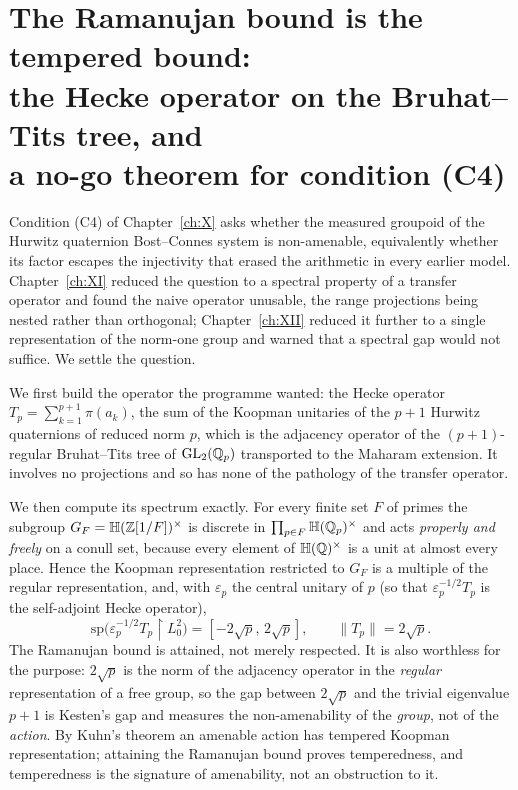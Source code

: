 \chapter[The Ramanujan bound is the tempered bound]{The Ramanujan bound is the tempered bound:\\ the Hecke operator on the Bruhat--Tits tree, and\\ a no-go theorem for condition (C4)}\label{ch:XXVIII}
\renewcommand{\Nrd}{\operatorname{Nrd}}
\begin{summary}
Condition (C4) of Chapter~\ref{ch:X} asks whether the measured groupoid of the Hurwitz
quaternion Bost--Connes system is non-amenable, equivalently whether its factor escapes the
injectivity that erased the arithmetic in every earlier model. Chapter~\ref{ch:XI} reduced the question to a
spectral property of a transfer operator and found the naive operator unusable, the range
projections being nested rather than orthogonal; Chapter~\ref{ch:XII} reduced it further to a single
representation of the norm-one group and warned that a spectral gap would not suffice. We settle
the question.

We first build the operator the programme wanted: the Hecke operator
$T_p=\sum_{k=1}^{p+1}\pi(a_k)$, the sum of the Koopman unitaries of the $p+1$ Hurwitz quaternions
of reduced norm $p$, which is the adjacency operator of the $(p+1)$-regular Bruhat--Tits tree of
$\mathrm{GL}_2(\mathbb{Q}_p)$ transported to the Maharam extension. It involves no projections and so has
none of the pathology of the transfer operator.

We then compute its spectrum exactly. For every finite set $F$ of primes the subgroup
$G_F=\mathbb{H}(\mathbb{Z}[1/F])^\times$ is discrete in $\prod_{p\in F}\mathbb{H}(\mathbb{Q}_p)^\times$ and acts \emph{properly
and freely} on a conull set, because every element of $\mathbb{H}(\mathbb{Q})^\times$ is a unit at almost every
place. Hence the Koopman representation restricted to $G_F$ is a multiple of the regular
representation, and, with $\varepsilon_p$ the central unitary of $p$ (so that
$\varepsilon_p^{-1/2}T_p$ is the self-adjoint Hecke operator),
\[
\mathrm{sp}\bigl(\varepsilon_p^{-1/2}T_p\restriction L^2_0\bigr)=[-2\sqrt p,\,2\sqrt p],\qquad \|T_p\|=2\sqrt p .
\]
The Ramanujan bound is attained, not merely respected. It is also worthless for the purpose:
$2\sqrt p$ is the norm of the adjacency operator in the \emph{regular} representation of a free
group, so the gap between $2\sqrt p$ and the trivial eigenvalue $p+1$ is Kesten's gap and measures
the non-amenability of the \emph{group}, not of the \emph{action}. By Kuhn's theorem an amenable
action has tempered Koopman representation; attaining the Ramanujan bound proves temperedness, and
temperedness is the signature of amenability, not an obstruction to it.


\end{summary}
